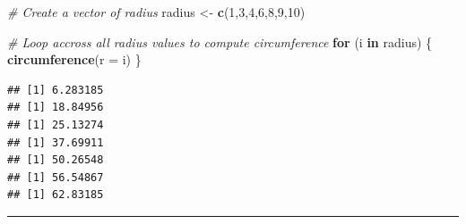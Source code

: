 \documentclass[
]{article}
\newenvironment{Shaded}{\begin{snugshade}}{\end{snugshade}}
\newcommand{\AttributeTok}[1]{\textcolor[rgb]{0.13,0.29,0.53}{#1}}
\newcommand{\CommentTok}[1]{\textcolor[rgb]{0.56,0.35,0.01}{\textit{#1}}}
\newcommand{\ControlFlowTok}[1]{\textcolor[rgb]{0.13,0.29,0.53}{\textbf{#1}}}
\newcommand{\DecValTok}[1]{\textcolor[rgb]{0.00,0.00,0.81}{#1}}
\newcommand{\FunctionTok}[1]{\textcolor[rgb]{0.13,0.29,0.53}{\textbf{#1}}}
\newcommand{\NormalTok}[1]{#1}
\newcommand{\OtherTok}[1]{\textcolor[rgb]{0.56,0.35,0.01}{#1}}
\begin{document}
\begin{Shaded}
\begin{Highlighting}[]
\CommentTok{\# Create a vector of radius}
\NormalTok{radius }\OtherTok{\textless{}{-}} \FunctionTok{c}\NormalTok{(}\DecValTok{1}\NormalTok{,}\DecValTok{3}\NormalTok{,}\DecValTok{4}\NormalTok{,}\DecValTok{6}\NormalTok{,}\DecValTok{8}\NormalTok{,}\DecValTok{9}\NormalTok{,}\DecValTok{10}\NormalTok{)}

\CommentTok{\# Loop accross all radius values to compute circumference}
\ControlFlowTok{for}\NormalTok{ (i }\ControlFlowTok{in}\NormalTok{ radius) \{}
  \FunctionTok{circumference}\NormalTok{(}\AttributeTok{r =}\NormalTok{ i)}
\NormalTok{\}}
\end{Highlighting}
\end{Shaded}

\begin{verbatim}
## [1] 6.283185
## [1] 18.84956
## [1] 25.13274
## [1] 37.69911
## [1] 50.26548
## [1] 56.54867
## [1] 62.83185
\end{verbatim}

\begin{center}\rule{0.5\linewidth}{0.5pt}\end{center}
\end{document}
